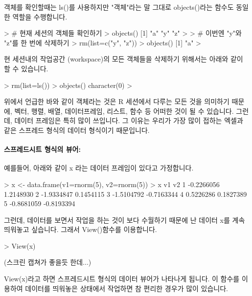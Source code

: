 객체를 확인할때는 ls()를 사용하지만 "객체"라는 말 그대로 objects()라는 함수도 동일한 역할을 수행합니다. 

\begin{Schunk}
\begin{Soutput}
	
> # 현재 세션의 객체들 확인하기 
> objects()
[1] "a" "y" "z"
>
> # 이번엔 "y"와 "z"를 한 번에 삭제하기 
> rm(list=c("y", "z"))
> objects()
[1] "a"
> 
\end{Soutput}
\end{Schunk}

현 세션내의 작업공간 (workspace)의 모든 객체들을 삭제하기 위해서는 아래와 같이 할 수 있습니다. 

\begin{Schunk}
\begin{Soutput}
> rm(list=ls())
> objects()
character(0)
> 
\end{Soutput}
\end{Schunk}

위에서 언급한 바와 같이 객체라는 것은 R 세션에서 다루는 모든 것을 의미하기 때문에, 벡터, 행렬, 배열, 데이터프레임, 리스트, 함수 등 어떠한  것이 될 수 있습니다. 
그런데, 데이터 프레임은 특히 많이 쓰입니다. 
그 이유는 우리가 가장 많이 접하는 엑셀과 같은 스프레드 형식의 데이터 형식이기 때문입니다.

\paragraph{스프레드시트 형식의 뷰어:}
예를들어, 아래와 같이 x 라는 데이터 프레임이 있다고 가정합니다. 


\begin{Schunk}
\begin{Soutput}
> x <- data.frame(v1=rnorm(5), v2=rnorm(5))
> x
          v1         v2
1 -0.2266056  1.2148930
2 -1.9334847  0.1454115
3 -1.5104792 -0.7163344
4  0.5226286  0.1827389
5 -0.8681059 -0.8193394
\end{Soutput}
\end{Schunk}

그런데, 데이터를 보면서 작업을 하는 것이 보다 수월하기 때문에 난 데이터 x를 계속 띄워놓고 싶습니다.
그래서 View()함수를 이용합니다.
\begin{Schunk}
\begin{Soutput}
> View(x)
\end{Soutput}
\end{Schunk}
(스크린 캡쳐가 좋을듯 한데...)

View(x)라고 하면 스프레드시트 형식의 데이터 뷰어가 나타나게 됩니다. 
이 함수를 이용하여 데이터를 띄워놓은 상태에서 작업하면 참 편리한 경우가 많이 있습니다.

